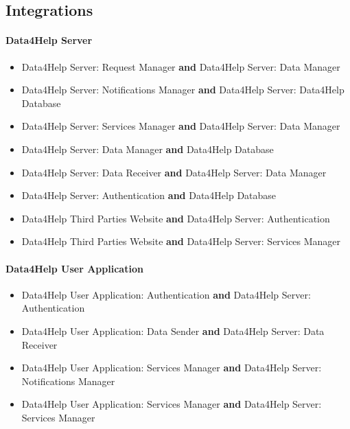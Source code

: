 \documentclass[../DD.tex]{subfiles}
\begin{document}
\subsection{Integrations}
\paragraph{Data4Help Server}
\begin{itemize}
	\item{Data4Help Server: Request Manager \textbf{and} Data4Help Server: Data Manager}
	\item{Data4Help Server: Notifications Manager \textbf{and} Data4Help Server: Data4Help Database}
	\item{Data4Help Server: Services Manager \textbf{and} Data4Help Server: Data Manager}
	\item{Data4Help Server: Data Manager \textbf{and} Data4Help Database}
	\item{Data4Help Server: Data Receiver \textbf{and} Data4Help Server: Data Manager}
	\item{Data4Help Server: Authentication \textbf{and} Data4Help Database}
	\item{Data4Help Third Parties Website \textbf{and} Data4Help Server: Authentication}
	\item{Data4Help Third Parties Website \textbf{and} Data4Help Server: Services Manager}
\end{itemize}

\paragraph{Data4Help User Application}
\begin{itemize}
	\item{Data4Help User Application: Authentication \textbf{and} Data4Help Server: Authentication}
	\item{Data4Help User Application: Data Sender \textbf{and} Data4Help Server: Data Receiver}
	\item{Data4Help User Application: Services Manager \textbf{and} Data4Help Server: Notifications Manager}
	\item{Data4Help User Application: Services Manager \textbf{and} Data4Help Server: Services Manager}
\end{itemize}
\end{document}
